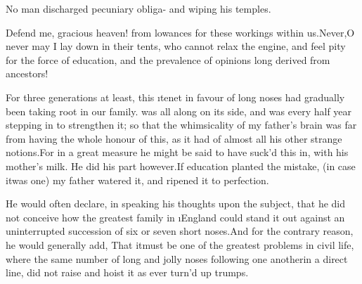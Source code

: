 \documentclass[twoside]{article}
\begin{document}
No man discharged pecuniary obliga-
and wiping his temples.

Defend me, gracious heaven! from 
lowances for these workings within us.\tsk Never,\tsk O never may I lay down in their
tents, who cannot relax the engine, and feel pity for the force of
education, and the prevalence of opinions long derived from
ancestors!

For three generations at least, this \i{te\-net} in favour of
long noses had gradually been taking root in our family.\tsh
{} was all along on its side, and
 was every half year stepping in to strengthen
it; so that the whimsicality of my father’s brain was far
from
having the whole honour of this, as it had of almost all his
other strange notions.\tsk For in a great measure he might be
said to have suck’d this in, with his mother’s milk. He did his
part however.\tsh If\break
education planted the mistake, (in case it\break was one) my father
watered it, and ri\-pened it to perfection.

He would often declare, in speaking his thoughts upon the
subject, that he did not conceive how the greatest family in
\i{England} could stand it out against an uninterrupted
succession of six or seven short noses.\tsk And for the contrary
reason, he would generally add, That it\break must be one of
the greatest problems in civil life, where the same number of long
and jolly noses following one another\break in a direct line, did not
raise and hoist it
as ever turn’d up trumps.
\end{document}
